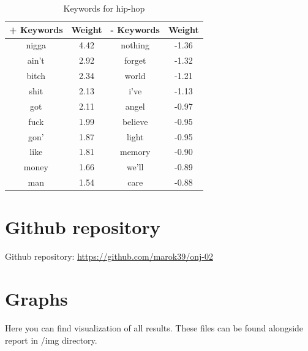 \documentclass[a4paper,11pt]{article}
\begin{document}
\begin{table}[h!]
\centering
\label{baseline}
\begin{tabular}{cccc}
\hline
+ Keywords & Weight & - Keywords & Weight \\
\hline
nigga & 4.42 & nothing & -1.36 \\
ain't & 2.92 & forget & -1.32 \\
bitch & 2.34 & world & -1.21 \\
shit & 2.13 & i've & -1.13 \\
got & 2.11 & angel & -0.97 \\
fuck & 1.99 & believe & -0.95 \\
gon' & 1.87 & light & -0.95 \\
like & 1.81 & memory & -0.90 \\
money & 1.66 & we'll & -0.89 \\
man & 1.54 & care & -0.88 \\
\end{tabular}
\caption{Keywords for hip-hop}
\end{table}



\pagebreak
\section{Github repository}
Github repository: \href{https://github.com/marok39/onj-02}{https://github.com/marok39/onj-02}


\appendix
\appendixpage
\section{\label{label-graphs} Graphs}

Here you can find visualization of all results. These files can be found alongside report in /img directory.
\end{document}
